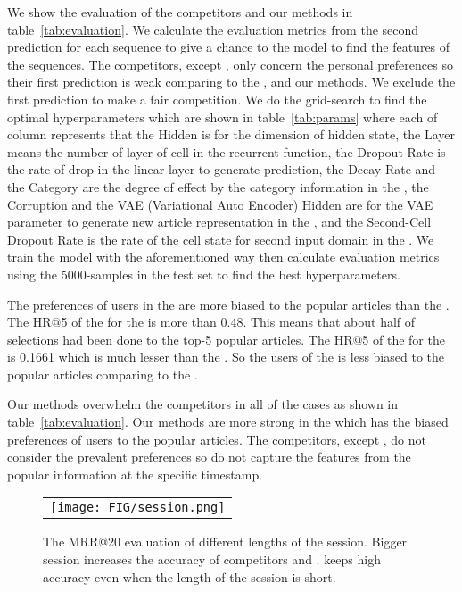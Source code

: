 We show the evaluation of the competitors and our methods in table~\ref{tab:evaluation}.
We calculate the evaluation metrics from the second prediction for each sequence to give a chance to the model to find the features of the sequences.
The competitors, except \compPopName, only concern the personal preferences so their first prediction is weak comparing to the \compPopName, and our methods.
We exclude the first prediction to make a fair competition.
We do the grid-search to find the optimal hyperparameters which are shown in table~\ref{tab:params} where each of column represents that
the Hidden is for the dimension of hidden state,
the Layer means the number of layer of cell in the recurrent function,
the Dropout Rate is the rate of drop in the linear layer to generate prediction,
the Decay Rate and the Category are the degree of effect by the category information in the \compNaverName,
the Corruption and the VAE (Variational Auto Encoder) Hidden are for the VAE parameter to generate new article representation in the \compYahooName, 
and the Second-Cell Dropout Rate is the rate of the cell state for second input domain in the \methodname.
We train the model with the aforementioned way then calculate evaluation metrics using the 5000-samples in the test set to find the best hyperparameters.

The preferences of users in the \dataAdressa are more biased to the popular articles than the \dataGloboName.
The HR@5 of the \compPop for the \dataAdressa is more than 0.48.
This means that about half of selections had been done to the top-5 popular articles.
The HR@5 of the \compPop for the \dataGlobo is 0.1661 which is much lesser than the \dataAdressaName.
So the users of the \dataGlobo is less biased to the popular articles comparing to the \dataAdressaName.

Our methods overwhelm the competitors in all of the cases as shown in table~\ref{tab:evaluation}.
Our methods are more strong in the \dataAdressa which has the biased preferences of users to the popular articles.
The competitors, except \compPopName, do not consider the prevalent preferences so do not capture the features from the popular information at the specific timestamp.

\begin{figure}[ht]
\begin{center}
\begin{tabular}{c}
     \texttt{[image: FIG/session.png]} \\
\end{tabular}
\caption{
	The MRR@20 evaluation of different lengths of the session.
	Bigger session increases the accuracy of competitors and \methodname.
	\method keeps high accuracy even when the length of the session is short.
}
\label{fig:largerDataset}
\end{center}
\end{figure}

